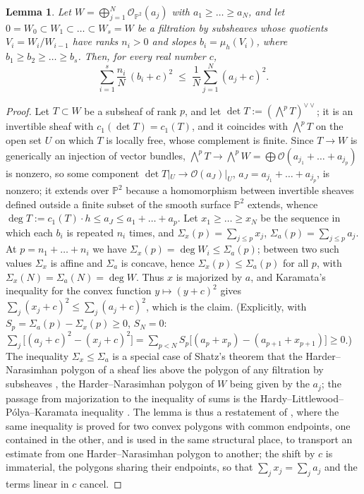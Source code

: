 \documentclass[11pt]{amsart}
\newtheorem{lemma}[theorem]{Lemma}
\theoremstyle{remark}
\theoremstyle{definition}
\newcommand{\PP}{\mathbb{P}}
\newcommand{\cO}{\mathcal{O}}
\begin{document}
\begin{lemma}\label{lem:maj}
Let $W=\bigoplus_{j=1}^N\cO_{\PP^2}(a_j)$ with $a_1\ge\dots\ge a_N$, and let $0=W_0\subset W_1\subset\dots\subset W_s=W$ be a filtration by subsheaves whose quotients $V_i=W_i/W_{i-1}$ have ranks $n_i>0$ and slopes $b_i=\mu_h(V_i)$, where $b_1\ge b_2\ge\dots\ge b_s$. Then, for every real number $c$,
\[
\sum_{i=1}^s\frac{n_i}{N}\,(b_i+c)^2\;\le\;\frac1N\sum_{j=1}^N(a_j+c)^2 .
\]
\end{lemma}

\begin{proof}
Let $T\subset W$ be a subsheaf of rank $p$, and let $\det T:=(\bigwedge^pT)^{\vee\vee}$; it is an invertible sheaf with $c_1(\det T)=c_1(T)$, and it coincides with $\bigwedge^pT$ on the open set $U$ on which $T$ is locally free, whose complement is finite. Since $T\to W$ is generically an injection of vector bundles, $\bigwedge^pT\to\bigwedge^pW=\bigoplus\cO(a_{j_1}+\dots+a_{j_p})$ is nonzero, so some component $\det T|_U\to\cO(a_J)|_U$, $a_J=a_{j_1}+\dots+a_{j_p}$, is nonzero; it extends over $\PP^2$ because a homomorphism between invertible sheaves defined outside a finite subset of the smooth surface $\PP^2$ extends, whence $\deg T:=c_1(T)\cdot h\le a_J\le a_1+\dots+a_p$. Let $x_1\ge\dots\ge x_N$ be the sequence in which each $b_i$ is repeated $n_i$ times, and $\Sigma_x(p)=\sum_{j\le p}x_j$, $\Sigma_a(p)=\sum_{j\le p}a_j$. At $p=n_1+\dots+n_i$ we have $\Sigma_x(p)=\deg W_i\le\Sigma_a(p)$; between two such values $\Sigma_x$ is affine and $\Sigma_a$ is concave, hence $\Sigma_x(p)\le\Sigma_a(p)$ for all $p$, with $\Sigma_x(N)=\Sigma_a(N)=\deg W$. Thus $x$ is majorized by $a$, and Karamata's inequality for the convex function $y\mapsto(y+c)^2$ gives $\sum_j(x_j+c)^2\le\sum_j(a_j+c)^2$, which is the claim. (Explicitly, with $S_p=\Sigma_a(p)-\Sigma_x(p)\ge0$, $S_N=0$: $\sum_j\bigl[(a_j+c)^2-(x_j+c)^2\bigr]=\sum_{p<N}S_p\bigl[(a_p+x_p)-(a_{p+1}+x_{p+1})\bigr]\ge0$.) The inequality $\Sigma_x\le\Sigma_a$ is a special case of Shatz's theorem that the Harder--Narasimhan polygon of a sheaf lies above the polygon of any filtration by subsheaves \cite{Sh}, the Harder--Narasimhan polygon of $W$ being given by the $a_j$; the passage from majorization to the inequality of sums is the Hardy--Littlewood--P\'olya--Karamata inequality \cite{HLP,Ka}. The lemma is thus a restatement of \cite[Lem.~1.5]{Lan}, where the same inequality is proved for two convex polygons with common endpoints, one contained in the other, and is used in the same structural place, to transport an estimate from one Harder--Narasimhan polygon to another; the shift by $c$ is immaterial, the polygons sharing their endpoints, so that $\sum_jx_j=\sum_ja_j$ and the terms linear in $c$ cancel.
\end{proof}
\end{document}
